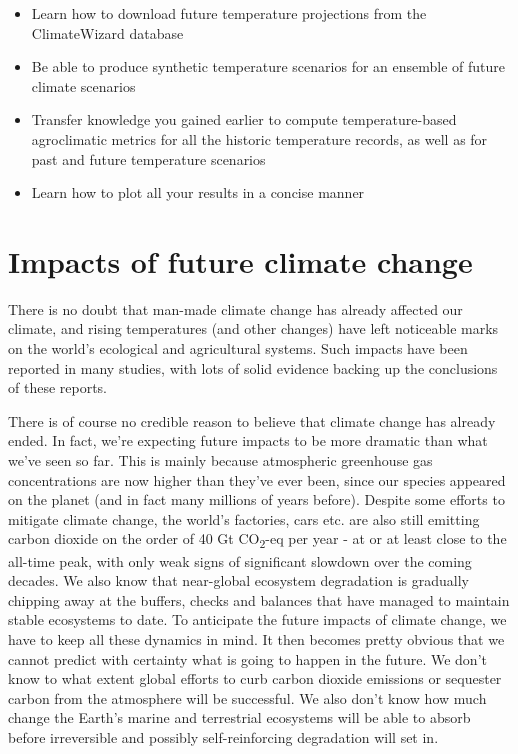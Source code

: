 \documentclass[
]{book}
\providecommand{\tightlist}{%
  \setlength{\itemsep}{0pt}\setlength{\parskip}{0pt}}
\begin{document}
\begin{itemize}
\tightlist
\item
  Learn how to download future temperature projections from the ClimateWizard database
\item
  Be able to produce synthetic temperature scenarios for an ensemble of future climate scenarios
\item
  Transfer knowledge you gained earlier to compute temperature-based agroclimatic metrics for all the historic temperature records, as well as for past and future temperature scenarios
\item
  Learn how to plot all your results in a concise manner
\end{itemize}

\hypertarget{impacts-of-future-climate-change}{%
\section{Impacts of future climate change}\label{impacts-of-future-climate-change}}

There is no doubt that man-made climate change has already affected our climate, and rising temperatures (and other changes) have left noticeable marks on the world's ecological and agricultural systems. Such impacts have been reported in many studies, with lots of solid evidence backing up the conclusions of these reports.

There is of course no credible reason to believe that climate change has already ended. In fact, we're expecting future impacts to be more dramatic than what we've seen so far. This is mainly because atmospheric greenhouse gas concentrations are now higher than they've ever been, since our species appeared on the planet (and in fact many millions of years before). Despite some efforts to mitigate climate change, the world's factories, cars etc. are also still emitting carbon dioxide on the order of 40 Gt CO\textsubscript{2}-eq per year - at or at least close to the all-time peak, with only weak signs of significant slowdown over the coming decades. We also know that near-global ecosystem degradation is gradually chipping away at the buffers, checks and balances that have managed to maintain stable ecosystems to date. To anticipate the future impacts of climate change, we have to keep all these dynamics in mind. It then becomes pretty obvious that we cannot predict with certainty what is going to happen in the future. We don't know to what extent global efforts to curb carbon dioxide emissions or sequester carbon from the atmosphere will be successful. We also don't know how much change the Earth's marine and terrestrial ecosystems will be able to absorb before irreversible and possibly self-reinforcing degradation will set in.
\end{document}
